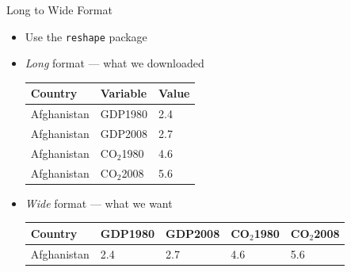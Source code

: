 \documentclass{beamer}
\begin{document}
\begin{frame}{Long to Wide Format}
  \begin{itemize}
  \item Use the {\tt reshape} package
  \item \emph{Long} format --- what we downloaded \\
    \begin{table}
      \begin{tabular}{ | l | l | l | } \hline
	Country		& Variable		& Value \\ \hline
	Afghanistan	& GDP1980		& 2.4   \\ \hline
	Afghanistan	& GDP2008  		& 2.7   \\ \hline
	Afghanistan	& CO$_2$1980  	& 4.6   \\ \hline
	Afghanistan	& CO$_2$2008  	& 5.6   \\ \hline
      \end{tabular}
    \end{table}
    
  \item \emph{Wide} format --- what we want \\
    \begin{table}
      \begin{tabular}{| l || l | l | l | l |} \hline
	Country		& GDP1980	& GDP2008	& CO$_2$1980	& CO$_2$2008 \\ \hline
	Afghanistan	& 2.4			& 2.7			& 4.6				& 5.6 \\ \hline
      \end{tabular}
    \end{table}
  \end{itemize}
\end{frame}
\end{document}
